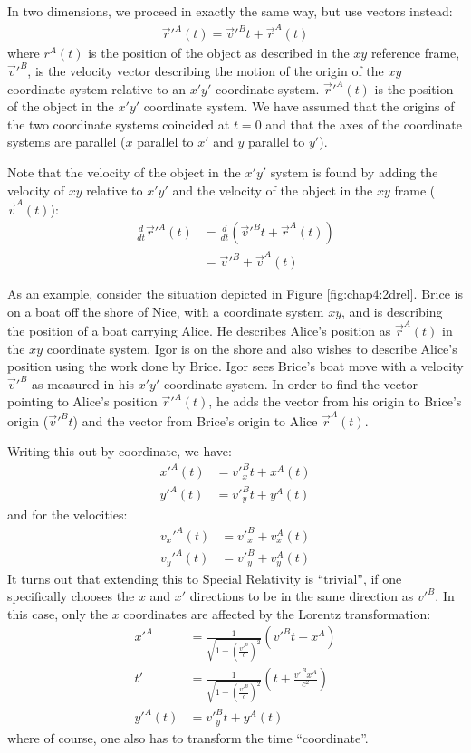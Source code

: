 In two dimensions, we proceed in exactly the same way, but use vectors instead:
\begin{align*}
\vec r'^A(t) = \vec v'^Bt+\vec r^A(t)
\end{align*}
where $r^A(t)$ is the position of the object as described in the $xy$ reference frame, $\vec v'^B$, is the velocity vector describing the motion of the origin of the $xy$ coordinate system relative to an $x'y'$ coordinate system. $\vec r'^A(t)$ is the position of the object in the $x'y'$ coordinate system. We have assumed that the origins of the two coordinate systems coincided at $t=0$ and that the axes of the coordinate systems are parallel ($x$ parallel to $x'$ and $y$ parallel to $y'$).

Note that the velocity of the object in the $x'y'$ system is found by adding the velocity of $xy$ relative to $x'y'$ and the velocity of the object in the $xy$ frame ($\vec v^A(t)$):
\begin{align*}
\frac{d}{dt}\vec r'^A(t) &=\frac{d}{dt}(\vec v'^Bt+\vec r^A(t))\\
&=\vec v'^B+\vec v^A(t)
\end{align*}

As an example, consider the situation depicted in Figure \ref{fig:chap4:2drel}. Brice is on a boat off the shore of Nice, with a coordinate system $xy$, and is describing the position of a boat carrying Alice. He describes Alice's position as $\vec r^A(t)$ in the $xy$ coordinate system. Igor is on the shore and also wishes to describe Alice's position using the work done by Brice. Igor sees Brice's boat move with a velocity $\vec v'^B$ as measured in his $x'y'$ coordinate system. In order to find the vector pointing to Alice's position $\vec r'^A(t)$, he adds the vector from his origin to Brice's origin ($\vec v'^B t$) and the vector from Brice's origin to Alice $\vec r^A(t)$.


Writing this out by coordinate, we have:
\begin{align*}
x'^A(t)&=v'^B_xt+x^A(t)\\
y'^A(t)&=v'^B_yt+y^A(t)
\end{align*}
and for the velocities:
\begin{align*}
v_x'^A(t)&=v'^B_x+v_x^A(t)\\
v_y'^A(t)&=v'^B_y+v_y^A(t)
\end{align*}
It turns out that extending this to Special Relativity is ``trivial'', if one specifically chooses the $x$ and $x'$ directions to be in the same direction as $v'^B$. In this case, only the $x$ coordinates are affected by the Lorentz transformation:
\begin{align*}
x'^A&=\frac{1}{\sqrt{1-\left(\frac{v'^B}{c}\right)^2}}(v'^Bt+x^A)\\
t'&=\frac{1}{\sqrt{1-\left(\frac{v'^B}{c}\right)^2}}\left(  t+\frac{v'^Bx^A}{c^2} \right)\\
y'^A(t)&=v'^B_yt+y^A(t)
\end{align*}
where of course, one also has to transform the time ``coordinate''.

